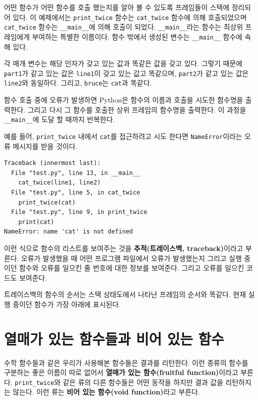 \documentclass[10pt]{book}
\begin{document}
어떤 함수가 어떤 함수를 호출 했는지를 알아 볼 수 있도록 프레임들이
스택에 정리되어 있다.  이 예제에서는 \verb"print_twice" 함수는
\verb"cat_twice" 함수에 의해 호출되었으며 \verb"cat_twice" 함수는
\verb"__main__"에 의해 호출이 되었다.  \verb"__main__"라는 함수는
최상위 프레임에게 부여하는 특별한 이름이다.  함수 밖에서 생성된 변수는
\verb"__main__" 함수에 속해 있다.

각 매개 변수는 해당 인자가 갖고 있는 값과 똑같은 값을 갖고 있다.
그렇기 때문에 {\tt part1}가 같고 있는 값은 {\tt line1}이 갖고 있는 값고
똑같으며, {\tt part2}가 같고 있는 값은 {\tt line2}와 동일하다. 그리고,
{\tt bruce}는 {\tt cat}과 똑같다.

함수 호출 중에 오류가 발생하면 Python은 함수의 이름과 호출을 시도한
함수명을 출력한다.  그리고 다시 그 함수를 호출한 상위 프레임의 함수명을
출력한다.  이 과정을 \verb"__main__"에 도달 할 때까지 반복한다.

예를 들어, \verb"print_twice" 내에서 {\tt cat}를 접근하려고 시도 한다면
{\tt NameError}이라는 오류 메시지를 받을 것이다.

\begin{verbatim}
Traceback (innermost last):
  File "test.py", line 13, in __main__
    cat_twice(line1, line2)
  File "test.py", line 5, in cat_twice
    print_twice(cat)
  File "test.py", line 9, in print_twice
    print(cat)
NameError: name 'cat' is not defined
\end{verbatim}
%
이런 식으로 함수의 리스트를 보여주는 것을 {\bf 추적(트레이스백,
  traceback)}이라고 부른다.  오류가 발생했을 때 어떤 프로그램 파일에서
오류가 발생했는지 그리고 실행 중이던 함수와 오류를 일으킨 줄 번호에 대한
정보를 보여준다.  그리고 오류를 일으킨 코드도 보여준다.


트레이스백의 함수의 순서는 스택 상태도에서 나타난 프레임의 순서와
똑같다.  현재 실행 중이던 함수가 가장 아래에 표시된다.



\section{열매가 있는 함수들과 비어 있는 함수}

수학 함수들과 같은 우리가 사용해본 함수들은 결과를 리턴한다.  이런
종류의 함수를 구분하는 좋은 이름이 따로 없어서 {\bf 열매가 있는
  함수(fruitful function)}이라고 부른다.  \verb"print_twice"와 같은
류의 다른 함수들은 어떤 동작을 하지만 결과 값을 리턴하지는 않는다.
이런 류는 {\bf 비어 있는 함수(void function)}라고 부른다.
\end{document}
